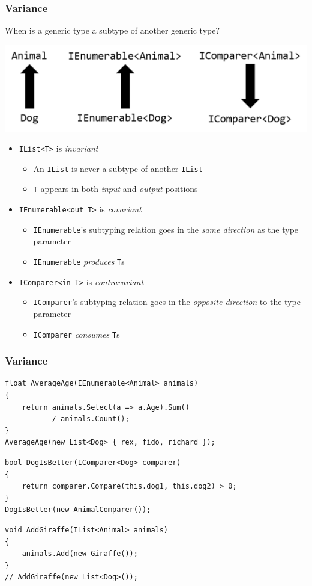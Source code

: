 \documentclass{beamer}
\begin{document}
  \begin{frame}
    \frametitle{Variance}
    When is a generic type a subtype of another generic type?
    \begin{center}
    \includegraphics[scale=0.5]{variance.png}
    \end{center}
    \begin{itemize}
      \item \texttt{IList<T>} is \emph{invariant}
      \begin{itemize}
        \item An \texttt{IList} is never a subtype of another \texttt{IList}
        \item \texttt{T} appears in both \emph{input} and \emph{output} positions
      \end{itemize}
      \item \texttt{IEnumerable<out T>} is \emph{covariant}
      \begin{itemize}
        \item \texttt{IEnumerable}'s subtyping relation goes in the \emph{same direction} as the type parameter
        \item \texttt{IEnumerable} \emph{produces} \texttt{T}s
      \end{itemize}
      \item \texttt{IComparer<in T>} is \emph{contravariant}
      \begin{itemize}
        \item \texttt{IComparer}'s subtyping relation goes in the \emph{opposite direction} to the type parameter
        \item \texttt{IComparer} \emph{consumes} \texttt{T}s
      \end{itemize}
    \end{itemize}
  \end{frame}

  \begin{frame}[fragile]
    \frametitle{Variance}
    \begin{verbatim}
float AverageAge(IEnumerable<Animal> animals)
{
    return animals.Select(a => a.Age).Sum()
           / animals.Count();
}
AverageAge(new List<Dog> { rex, fido, richard });
    \end{verbatim}
    \pause
    \begin{verbatim}
bool DogIsBetter(IComparer<Dog> comparer)
{
    return comparer.Compare(this.dog1, this.dog2) > 0;
}
DogIsBetter(new AnimalComparer());
    \end{verbatim}
    \pause
    \begin{verbatim}
void AddGiraffe(IList<Animal> animals)
{
    animals.Add(new Giraffe());
}
// AddGiraffe(new List<Dog>());
    \end{verbatim}
\end{frame}
  
\end{document}
